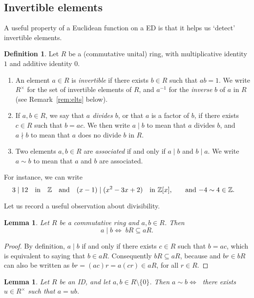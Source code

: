 \documentclass[12pt]{article}
\newcommand{\qbox}[1]{\quad\hbox{#1}\quad}
\newtheorem{lemma}[thm]{Lemma}
\theoremstyle{definition}
\newtheorem{defn}[thm]{Definition}
\newcounter{ex}\renewcommand\theex{\arabic{ex}}
\newcommand{\Z}{\ensuremath{\mathbb{Z}}}
\begin{document}

\subsection{Invertible elements}\label{ssec:invert}

A useful property of a Euclidean function on a ED is that it helps us
`detect' invertible elements.

\begin{defn}\label{def:invert}
Let $R$ be a (commutative unital) ring, with multiplicative identity
$1$ and additive identity $0$. 
\begin{enumerate}
\item
An element $a\in R$ is {\em invertible}
if there exists $b\in R$ such that $ab=1$. 
We write $R^\times$ for the set of invertible elements of $R$, and
$a^{-1}$ for the {\em inverse}
$b$ of $a$ in $R$ (see Remark~\ref{rem:elts} below).
\item If $a,b\in R$, we
say that {\em $a$ divides $b$}, or that {$a$ is a factor of $b$}, if
there exists $c\in R$ such that $b=ac$. We then write $a\mid b$ to
mean that $a$ divides $b$, and $a\nmid b$ to mean that $a$ does no
divide $b$ in $R$. 
\item
Two elements $a,b\in R$ are {\em associated}
if and only if $a\mid b$ and $b\mid a$. We write $a\sim b$
to mean that $a$ and $b$ are associated. 
\end{enumerate}
\end{defn}
For instance, we can write
$$3\mid12\qbox{in}\Z\qbox{and}(x-1)\mid(x^2-3x+2)\qbox{in $\Z[x]$,}
\qbox{and $-4\sim4\in\Z$.}$$


Let us record a useful observation about divisibility.

\begin{lemma}\label{lem:div-id}
Let $R$ be a commutative ring and $a,b\in R$. Then
$$a\mid b\Longleftrightarrow\;bR\subseteq aR.$$
\end{lemma}

\begin{proof}
By definition,
$a\mid b$ if and only if there exists $c\in R$ such that $b=ac$, which
is equivalent to saying that $b\in aR$. Consequently $bR\subseteq aR$,
because and $br\in bR$ can also be written as $br=(ac)r=a(cr)\in aR$,
for all $r\in R$.
\end{proof}

\begin{lemma}\label{lem:assoc-elts}
Let $R$ be an ID, and let $a,b\in R\setminus\{0\}$. 
Then $a\sim b\Longleftrightarrow\;$ there exists $u\in R^\times$ such
that $a=ub$.
\end{lemma}
\end{document}
